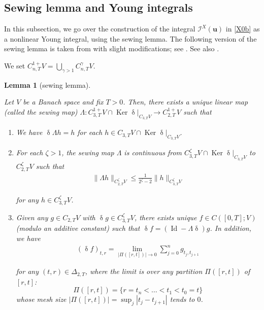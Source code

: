 \documentclass[letterpaper, 11pt,  reqno]{amsart}
\newtheorem{lemma}[theorem]{Lemma}
\DeclareMathOperator{\Id}{Id}
\DeclareMathOperator{\Ker}{Ker}
\newcommand{\1}{\hspace{0.5mm}\text{I}\hspace{0.5mm}}
\newcommand{\I}{\mathcal{I}}
\newcommand{\noi}{\noindent}
\newcommand{\updl}{\updelta}
\newcommand{\Dl}{\Delta}
\newcommand{\g}{\gamma}
\newcommand{\uu}{\mathbf{u}}
\newcommand{\z}{\zeta}
\numberwithin{equation}{section}
\numberwithin{theorem}{section}
\begin{document}
\subsection{Sewing lemma and Young integrals}
\label{SUBSEC:Y2}

In this subsection, 
we go over the construction 
of
 the integral $\I^X(\uu)$ in  \eqref{X0b} 
 as a nonlinear Young integral, 
 using the sewing lemma.
The following version of the sewing lemma
is taken from 
\cite{GT10} 
with slight modifications; 
see  
\cite[Proposition 2.3, Corollary 2.4, Corollary 2.5]{GT10}.
See also \cite[Lemma 4.2]{FH20}.

We set 
$C^{1+}_{n,T}V = \bigcup_{\g>1}C^\g_{n,T}V$.

\begin{lemma}[sewing lemma]
\label{LEM:sew}


Let $V$ be a Banach space and 
fix $T>0$. 
Then,  there exists a unique linear map \textup{(}called the sewing map\textup{)}
$\Lambda:C^{1+}_{3,T} V \cap 
\Ker \updl|_{C_{3,T}V}
\to C^{1+}_{2,T}V$ such that 

\smallskip
\begin{enumerate}
\item[(i)] 
We have 
$\updl \Lambda h = h$
for each  $h\in C_{3,T}V\cap \Ker  \updl|_{C_{3,T} V}$.



\smallskip

\item[(ii)]
 For each $\z >1$,
the sewing map $\Lambda$ is continuous
from $C^\z _{3,T}V\cap 
\Ker  \updl|_{C_{3,T} V}$ to 
$C^\z _{2,T}V$ such that 
\begin{align}
\|\Lambda h \|_{C^\z _{2,T}V} 
\le \frac{1}{2^\z - 2}  \| h \|_{C^\z _{3,T}V} 
\label{sew1}
\end{align}


\noi
for any $h\in C^\z _{3,T}V$.



\smallskip
\item[(iii)] 
Given any  $g\in C_{2,T}V$ 
with 
$\updl g\in C^\z _{3,T}V$, 
 there exists  unique
$f\in C([0, T];V)$  \textup{(}modulo an additive  constant\textup{)} 
such that 
$\updl f = (\Id - \Lambda \updl)g$. 
In addition, 
we have 
\begin{align}
(\updl f)_{t,r} = \lim_{|\Pi([r,t])|\to 0} 
\sum_{j=0}^n g_{t_j,t_{j+1}}
\label{sew2}
\end{align}


\noi
 for any $(t,r)\in \Dl_{2,T}$,
 where 
 the limit is over any partition
 $\Pi([r,t])$  
 of  $[r,t]$\textup{:} 
\[\Pi ([r,t]) = \{r = t_n < \dots < t_1 <  t_0 = t\}\]
whose mesh size 
$|\Pi([r,t])| = \sup_{j} |t_j-t_{j+1}|$ 
tends to $0$.


\end{enumerate}


\end{lemma}
\end{document}
